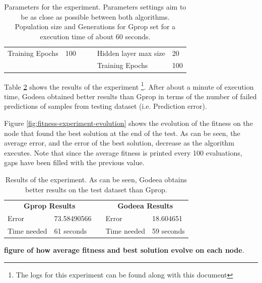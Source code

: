 \begin{table}[h!]
\begin{tabular}{llll|l|l|}
\multicolumn{1}{|l|}{Training Epochs}       & \multicolumn{1}{l|}{100}       &  &  & Hidden layer max size             & 20          \\ \cline{1-2} \cline{5-6} 
                                            &                                &  &  & Training Epochs                   & 100         \\ \cline{5-6} 
\end{tabular}
\caption{Parameters for the experiment. Parameters settings aim to be as close as possible between both algorithms. Population size and Generations for Gprop set for a execution time of about 60 seconds.}
\label{tab:fitness-experiment-parameters}
\end{table}

Table \ref{tab:fitness-experiment-results} shows the results of the experiment \footnote{The logs for this experiment can be found along with this document}. After about a minute of execution time, Godeea obtained better results than Gprop in terms of the number of failed predictions of samples from testing dataset (i.e. Prediction error).

Figure \ref{fig:fitness-experiment-evolution} shows the evolution of the fitness on the node that found the best solution at the end of the test. As can be seen, the average error, and the error of the best solution, decrease as the algorithm executes. Note that since the average fitness is printed every 100 evaluations, gaps have been filled with the previous value.

\begin{table}[h!]
\centering
\begin{tabular}{|l|l|l|l|l|}
\cline{1-2} \cline{4-5}
\multicolumn{2}{|c|}{\textbf{Gprop Results}} &           & \multicolumn{2}{c|}{\textbf{Godeea Results}} \\ \cline{1-2} \cline{4-5} 
Error                 & 73.58490566          &           & Error                 & 18.604651            \\ \cline{1-2} \cline{4-5} 
Time needed           & 61 seconds           & \textbf{} & Time needed           & 59 seconds           \\ \cline{1-2} \cline{4-5} 
\end{tabular}
\caption{Results of the experiment. As can be seen, Godeea obtains better results on the test dataset than Gprop.}
\label{tab:fitness-experiment-results}
\end{table}

\textbf{figure of how average fitness and best solution evolve on each node}.

